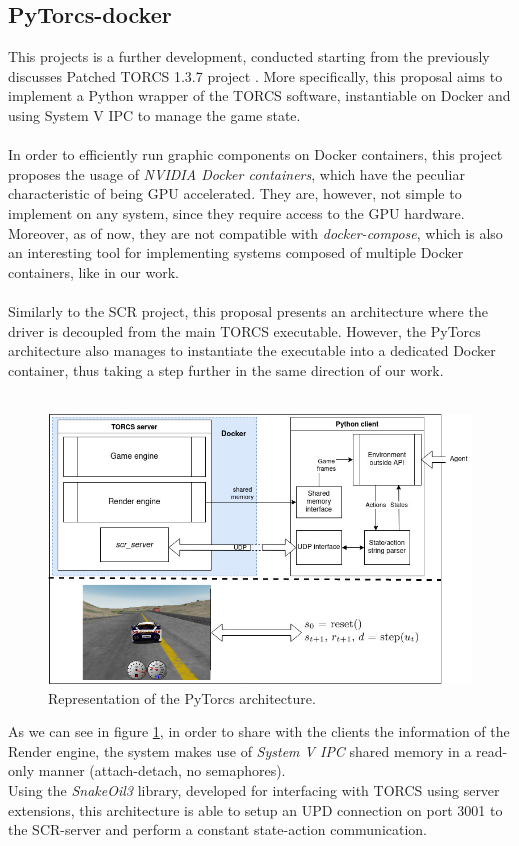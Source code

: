 \subsection{PyTorcs-docker}
This projects is a further development, conducted starting from the previously discusses Patched TORCS 1.3.7 project \cite{site:pytorcs}. More specifically, this proposal aims to implement a Python wrapper of the TORCS software, instantiable on Docker and using System V IPC to manage the game state. \\ \\
In order to efficiently run graphic components on Docker containers, this project proposes the usage of \textit{NVIDIA Docker containers}, which have the peculiar characteristic of being GPU accelerated. They are, however, not simple to implement on any system, since they require access to the GPU hardware. Moreover, as of now, they are not compatible with \textit{docker-compose}, which is also an interesting tool for implementing systems composed of multiple Docker containers, like in our work. \\ \\
Similarly to the SCR project, this proposal presents an architecture where the driver is decoupled from the main TORCS executable. However, the PyTorcs architecture also manages to instantiate the executable into a dedicated Docker container, thus taking a step further in the same direction of our work. \\ \\
\begin{figure}
	\centering
	\includegraphics[width=0.9\linewidth]{"immagini/Software development/PyTorcs architecture"}
	\caption[Representation of the PyTorcs architecture.]{Representation of the PyTorcs architecture.}
	\label{fig:pytorcs-architecture}
\end{figure}
As we can see in figure \ref{fig:pytorcs-architecture}, in order to share with the clients the information of the Render engine, the system makes use of \textit{System V IPC} shared memory in a read-only manner (attach-detach, no semaphores). \\ 
Using the \textit{SnakeOil3} library, developed for interfacing with TORCS using server extensions, this architecture is able to setup an UPD connection on port 3001 to the SCR-server and perform a constant state-action communication.

